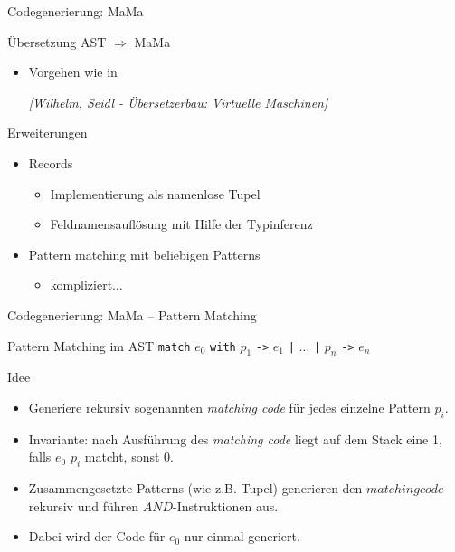 \documentclass[hyperref={pdfpagelabels=false}]{beamer}
\begin{document}
\begin{frame}{Codegenerierung: MaMa}
  \begin{block}{Übersetzung AST $\Longrightarrow$ MaMa}
    \begin{itemize}
      \item Vorgehen wie in
        \begin{center}
          \emph{[Wilhelm, Seidl - Übersetzerbau: Virtuelle Maschinen]}
        \end{center}
    \end{itemize}
  \end{block}
  \begin{block}{Erweiterungen}
    \begin{itemize}
      \item Records        
        \begin{itemize}
          \item Implementierung als namenlose Tupel
          \item Feldnamensauflösung mit Hilfe der Typinferenz
        \end{itemize}
	 \item Pattern matching mit beliebigen Patterns        
        \begin{itemize}
          \item \pause kompliziert$\ldots$
        \end{itemize}
    \end{itemize}
  \end{block}
\end{frame}

\begin{frame}{Codegenerierung: MaMa -- Pattern Matching}
  \begin{block}{Pattern Matching im AST}
  	\texttt{match} $e_0$ \texttt{with} $p_1$ \texttt{->} $e_1$ \texttt{|} $\ldots$ \texttt{|} $p_n$ \texttt{->} $e_n$
  \end{block}
  \begin{block}{Idee}
    \begin{itemize}
  	\item Generiere rekursiv sogenannten \emph{matching code} für jedes einzelne Pattern $p_i$.
  	\item Invariante: nach Ausführung des \emph{matching code} liegt auf dem Stack eine 1, falls $e_0$ $p_i$ matcht, sonst 0.
  	\item Zusammengesetzte Patterns (wie z.B. Tupel) generieren den $matching code$ rekursiv und führen $AND$-Instruktionen aus.  
  	\item Dabei wird der Code für $e_0$ nur einmal generiert.
  	\end{itemize}
  \end{block}
\end{frame}
\end{document}
